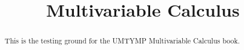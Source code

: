 \documentclass{xourse}
\title{Multivariable Calculus}
\begin{document}
  
\begin{abstract} %
This is the testing ground for the UMTYMP Multivariable Calculus book.  
\end{abstract}  
\maketitle  
 
 
\end{document}
